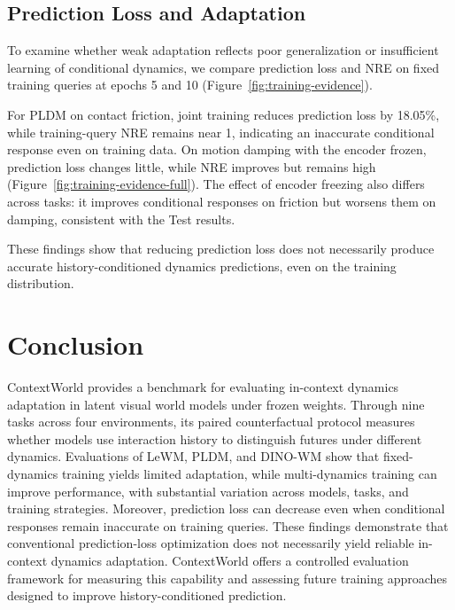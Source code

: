\subsection{Prediction Loss and Adaptation}
\label{sec:loss-adaptation}

To examine whether weak adaptation reflects poor generalization or insufficient learning of conditional dynamics, we compare prediction loss and NRE on fixed training queries at epochs 5 and 10 (Figure~\ref{fig:training-evidence}).

For PLDM on contact friction, joint training reduces prediction loss by 18.05\%, while training-query NRE remains near 1, indicating an inaccurate conditional response even on training data.
On motion damping with the encoder frozen, prediction loss changes little, while NRE improves but remains high (Figure~\ref{fig:training-evidence-full}).
The effect of encoder freezing also differs across tasks: it improves conditional responses on friction but worsens them on damping, consistent with the Test results.

These findings show that reducing prediction loss does not necessarily produce accurate history-conditioned dynamics predictions, even on the training distribution.



\section{Conclusion}
\label{sec:conclusion}

ContextWorld provides a benchmark for evaluating in-context dynamics adaptation in latent visual world models under frozen weights.
Through nine tasks across four environments, its paired counterfactual protocol measures whether models use interaction history to distinguish futures under different dynamics.
Evaluations of LeWM, PLDM, and DINO-WM show that fixed-dynamics training yields limited adaptation, while multi-dynamics training can improve performance, with substantial variation across models, tasks, and training strategies.
Moreover, prediction loss can decrease even when conditional responses remain inaccurate on training queries.
These findings demonstrate that conventional prediction-loss optimization does not necessarily yield reliable in-context dynamics adaptation.
ContextWorld offers a controlled evaluation framework for measuring this capability and assessing future training approaches designed to improve history-conditioned prediction.


